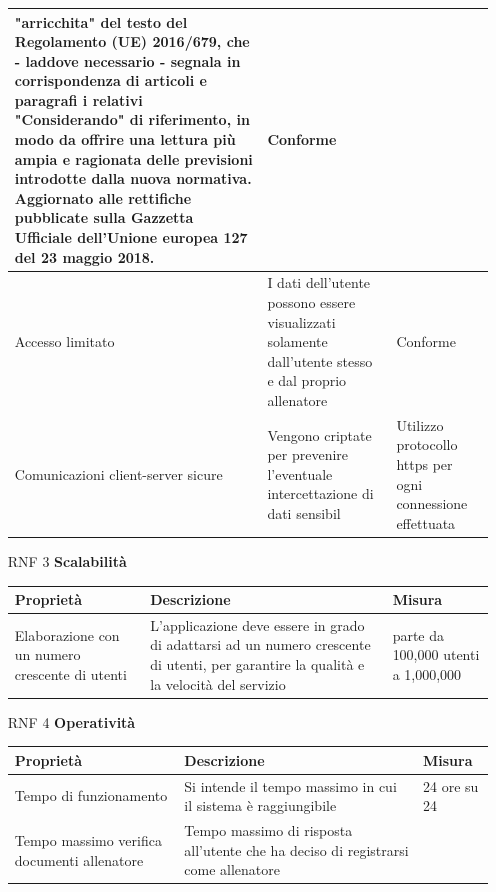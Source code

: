 \documentclass{article}
\begin{document}
\begin{itemize}
\begin{tabular}{|p{5cm}|p{11cm}|p{2cm}|}
                     "arricchita" del testo del Regolamento (UE) 2016/679, che - laddove necessario - segnala in corrispondenza di articoli e
                     paragrafi i relativi "Considerando" di riferimento, in modo da offrire una lettura più ampia e ragionata delle previsioni
                     introdotte dalla nuova normativa. Aggiornato alle rettifiche pubblicate sulla Gazzetta Ufficiale dell'Unione europea 127 del
                     23 maggio 2018. & Conforme\\
                     \hline
                     Accesso limitato & I dati dell’utente possono essere visualizzati solamente dall’utente stesso e dal proprio allenatore &
                     Conforme\\
                     \hline
                     Comunicazioni client-server sicure & Vengono criptate per prevenire l’eventuale intercettazione di dati sensibil & 
                     Utilizzo protocollo https per ogni connessione effettuata\\
                     \hline
                 \end{tabular}
   \item [RNF 3] \textbf{Scalabilità}\\
                 \begin{tabular}{|p{5cm}|p{11cm}|p{2cm}|}
                     \hline
                     Proprietà & Descrizione & Misura\\
                     \hline
                     Elaborazione con un numero crescente di utenti & L’applicazione deve essere in grado di adattarsi ad un numero crescente di
                     utenti, per garantire la qualità e la velocità del servizio & parte da 100,000 utenti a 1,000,000\\
                     \hline
                 \end{tabular}
   \item [RNF 4] \textbf{Operatività}\\
                 \begin{tabular}{|p{5cm}|p{11cm}|p{2cm}|}
                     \hline
                     Proprietà & Descrizione & Misura\\
                     \hline
                     Tempo di funzionamento & Si intende il tempo massimo in cui il sistema è raggiungibile & 24 ore su 24\\
                     \hline
                     Tempo massimo verifica documenti allenatore & Tempo massimo di risposta all’utente che ha deciso di registrarsi come allenatore & 

\end{tabular}
\end{itemize}
\end{document}
